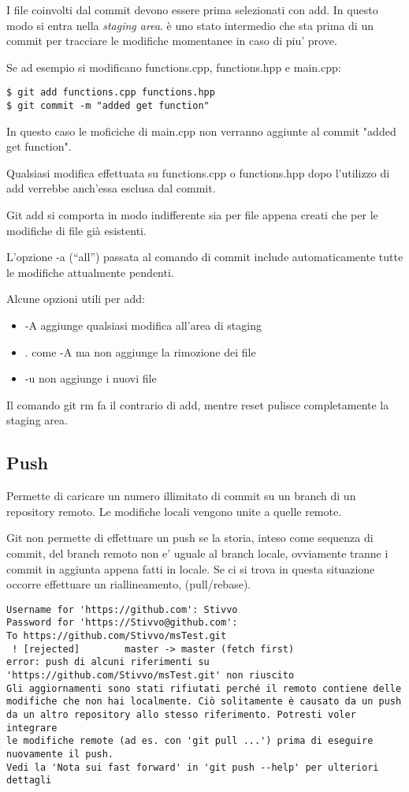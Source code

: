 \documentclass{article} \usepackage[textwidth=18cm,textheight=18cm]{geometry}
\begin{document}
I file coinvolti dal commit devono essere prima selezionati con add. In questo
modo si entra nella \textit{staging area}. è uno stato intermedio che sta prima di
un commit per tracciare le modifiche momentanee in caso di piu' prove.

Se ad esempio si modificano functions.cpp, functions.hpp e main.cpp:

\begin{verbatim}
$ git add functions.cpp functions.hpp
$ git commit -m "added get function"
\end{verbatim}

In questo caso le moficiche di main.cpp non verranno aggiunte al commit "added
get function".

Qualsiasi modifica effettuata su functions.cpp o functions.hpp dopo l'utilizzo
di add verrebbe anch'essa esclusa dal commit.

Git add si comporta in modo indifferente sia per file appena creati che per le
modifiche di file già esistenti.

L'opzione -a (``all'') passata al comando di commit include automaticamente tutte
le modifiche attualmente pendenti.

Alcune opzioni utili per add:

\begin{itemize}
    \item -A aggiunge qualsiasi modifica all'area di staging
    \item . come -A ma non aggiunge la rimozione dei file
    \item -u non aggiunge i nuovi file
\end{itemize}

Il comando git rm fa il contrario di add, mentre reset pulisce completamente la
staging area.

\subsection{Push}

Permette di caricare un numero illimitato di commit su un branch di un
repository remoto. Le modifiche locali vengono unite a quelle remote.

Git non permette di effettuare un push se la storia, inteso come sequenza di commit,
del branch remoto non e' uguale al branch locale, ovviamente tranne i commit in aggiunta
appena fatti in locale. Se ci si trova in questa situazione occorre effettuare un riallineamento,
(pull/rebase).

\begin{verbatim}
Username for 'https://github.com': Stivvo
Password for 'https://Stivvo@github.com':
To https://github.com/Stivvo/msTest.git
 ! [rejected]        master -> master (fetch first)
error: push di alcuni riferimenti su 'https://github.com/Stivvo/msTest.git' non riuscito
Gli aggiornamenti sono stati rifiutati perché il remoto contiene delle
modifiche che non hai localmente. Ciò solitamente è causato da un push
da un altro repository allo stesso riferimento. Potresti voler integrare
le modifiche remote (ad es. con 'git pull ...') prima di eseguire
nuovamente il push.
Vedi la 'Nota sui fast forward' in 'git push --help' per ulteriori
dettagli
\end{verbatim}
\end{document}
